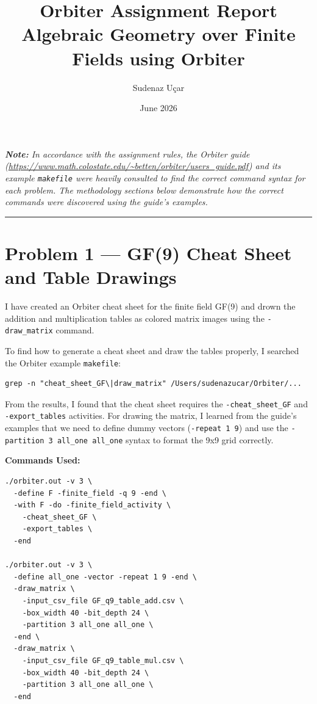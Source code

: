 \documentclass[12pt,a4paper]{article}
\title{\textbf{Orbiter Assignment Report} \\ \large Algebraic Geometry over Finite Fields using Orbiter}
\author{Sudenaz U\c{c}ar}
\date{June 2026}
\begin{document}
\maketitle

\noindent \textit{\textbf{Note:} In accordance with the assignment rules, the Orbiter guide (\url{https://www.math.colostate.edu/~betten/orbiter/users_guide.pdf}) and its example \texttt{makefile} were heavily consulted to find the correct command syntax for each problem. The methodology sections below demonstrate how the correct commands were discovered using the guide's examples.}

\vspace{0.5cm}
\hrule
\vspace{0.5cm}

\section*{Problem 1 --- GF(9) Cheat Sheet and Table Drawings}

I have created an Orbiter cheat sheet for the finite field GF(9) and drown the addition and multiplication tables as colored matrix images using the \texttt{-draw\_matrix} command.

To find how to generate a cheat sheet and draw the tables properly, I searched the Orbiter example \texttt{makefile}:
\begin{verbatim}
grep -n "cheat_sheet_GF\|draw_matrix" /Users/sudenazucar/Orbiter/...
\end{verbatim}
From the results, I found that the cheat sheet requires the \texttt{-cheat\_sheet\_GF} and \texttt{-export\_tables} activities. For drawing the matrix, I learned from the guide's examples that we need to define dummy vectors (\texttt{-repeat 1 9}) and use the \texttt{-partition 3 all\_one all\_one} syntax to format the 9x9 grid correctly.

\vspace{0.3cm}\noindent\textbf{Commands Used:}
\begin{verbatim}
./orbiter.out -v 3 \
  -define F -finite_field -q 9 -end \
  -with F -do -finite_field_activity \
    -cheat_sheet_GF \
    -export_tables \
  -end

./orbiter.out -v 3 \
  -define all_one -vector -repeat 1 9 -end \
  -draw_matrix \
    -input_csv_file GF_q9_table_add.csv \
    -box_width 40 -bit_depth 24 \
    -partition 3 all_one all_one \
  -end \
  -draw_matrix \
    -input_csv_file GF_q9_table_mul.csv \
    -box_width 40 -bit_depth 24 \
    -partition 3 all_one all_one \
  -end
\end{verbatim}
\end{document}
